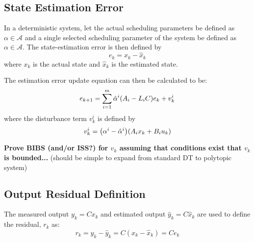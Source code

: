 \documentclass[]{article}
\begin{document}
\subsection{State Estimation Error}
In a deterministic system, let the actual scheduling parameters be defined as ${\alpha}\in \mathcal{A}$ and a single selected scheduling parameter of the system be defined as $\alpha \in \mathcal{A}$. The state-estimation error is then defined by
\begin{equation}\label{eq:est_error_def}
	e_k =x_k - \hat{x}_k 
\end{equation}
where $x_k$ is the actual state and $\hat{x}_k$ is the estimated state.

The estimation error update equation can then be calculated to be:
\begin{equation}\label{eq:est_error_update_def}
	e_{k+1} = \sum_{i=1}^{m} \hat{\alpha}^i \qty(A_i - L_i C) e_k + v_k^i
\end{equation}
where the disturbance term $v_k^i$ is defined by
\begin{equation}\label{eq:param_error_disturbance_def}
	v_k^i = \qty({\alpha}^i - \hat{\alpha}^i) \qty(A_i x_k + B_i u_k)
\end{equation}

\textbf{Prove BIBS (and/or ISS?) for $v_k$ assuming that conditions exist that $v_k$ is bounded...} (should be simple to expand from standard DT to polytopic system)


\subsection{Output Residual Definition}
The measured output $y_k = C x_k$ and estimated output $\hat{y}_k = C \hat{x}_k$ are used to define the residual, $r_k$ as:
\begin{equation}\label{eq:output_residual_def}
	r_k = y_k - \hat{y}_k = C(x_k - \hat{x}_k) = C e_k
\end{equation}

\end{document}
